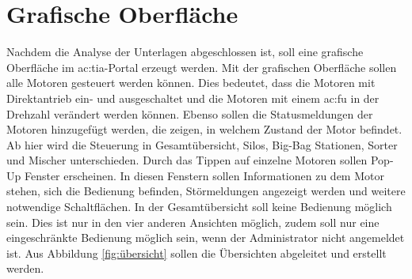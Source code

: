\begin{figure}[H] %
\end{figure} %


\section{Grafische Oberfläche}

Nachdem die Analyse der Unterlagen abgeschlossen ist, soll eine grafische Oberfläche im \gls{ac:tia}-Portal erzeugt werden. Mit der grafischen Oberfläche sollen alle Motoren gesteuert werden können. Dies bedeutet, dass die Motoren mit Direktantrieb ein- und ausgeschaltet und die Motoren mit einem \gls{ac:fu} in der Drehzahl verändert werden können. Ebenso sollen die Statusmeldungen der Motoren hinzugefügt werden, die zeigen, in welchem Zustand der Motor befindet. Ab hier wird die Steuerung in Gesamtübersicht, Silos, Big-Bag Stationen, Sorter und Mischer unterschieden. Durch das Tippen auf einzelne Motoren sollen Pop-Up Fenster erscheinen. In diesen Fenstern sollen Informationen zu dem Motor stehen, sich die Bedienung befinden, Störmeldungen angezeigt werden und weitere notwendige Schaltflächen. In der Gesamtübersicht soll keine Bedienung möglich sein. Dies ist nur in den vier anderen Ansichten möglich, zudem soll nur eine eingeschränkte Bedienung möglich sein, wenn der Administrator nicht angemeldet ist. Aus Abbildung \ref{fig:übersicht} sollen die Übersichten abgeleitet und erstellt werden.

